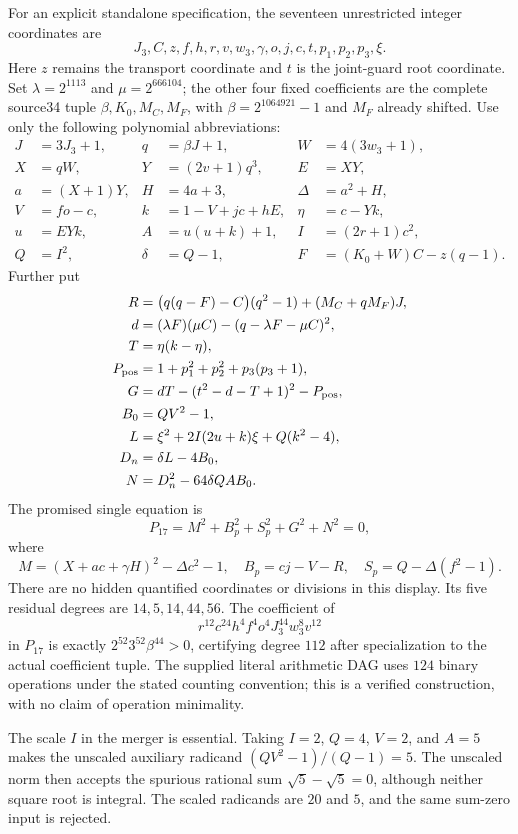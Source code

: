 \documentclass[11pt]{article}
\theoremstyle{remark}
\begin{document}
For an explicit standalone specification, the seventeen unrestricted
integer coordinates are
\[
 J_3,C,z,f,h,r,v,w_3,\gamma,o,j,c,t,p_1,p_2,p_3,\xi.
\]
Here $z$ remains the transport coordinate and $t$ is the joint-guard
root coordinate. Set $\lambda=2^{1113}$ and $\mu=2^{666104}$; the other
four fixed coefficients are the complete source34 tuple
$\beta,K_0,M_C,M_F$, with $\beta=2^{1064921}-1$ and $M_F$ already shifted.
Use only the following polynomial abbreviations:
\begin{align*}
 J&=3J_3+1,&q&=\beta J+1,&W&=4(3w_3+1),\\
 X&=qW,&Y&=(2v+1)q^3,&E&=XY,\\
 a&=(X+1)Y,&H&=4a+3,&\Delta&=a^2+H,\\
 V&=fo-c,&k&=1-V+jc+hE,&\eta&=c-Yk,\\
 u&=EYk,&A&=u(u+k)+1,&I&=(2r+1)c^2,\\
 Q&=I^2,&\delta&=Q-1,&F&=(K_0+W)C-z(q-1).
\end{align*}
Further put
\begin{align*}
 R&=\bigl(q(q-F)-C\bigr)(q^2-1)+(M_C+qM_F)J,\\
 d&=(\lambda F)(\mu C)-(q-\lambda F-\mu C)^2,\\
 T&=\eta(k-\eta),\\
 P_{\rm pos}&=1+p_1^2+p_2^2+p_3(p_3+1),\\
 G&=dT-(t^2-d-T+1)^2-P_{\rm pos},\\
 B_0&=QV^2-1,\\
 L&=\xi^2+2I(2u+k)\xi+Q(k^2-4),\\
 D_n&=\delta L-4B_0,\\
 N&=D_n^2-64\delta QAB_0.
\end{align*}
The promised single equation is
\begin{equation}\label{eq:full17}
 \boxed{P_{17}=M^2+B_p^2+S_p^2+G^2+N^2=0,}
\end{equation}
where
\[
 M=(X+ac+\gamma H)^2-\Delta c^2-1,\quad
 B_p=cj-V-R,\quad S_p=Q-\Delta(f^2-1).
\]
There are no hidden quantified coordinates or divisions in this display.
Its five residual degrees are $14,5,14,44,56$. The coefficient of
\[
 r^{12}c^{24}h^4f^4o^4J_3^{44}w_3^8v^{12}
\]
in $P_{17}$ is exactly $2^{52}3^{52}\beta^{44}>0$, certifying degree
$112$ after specialization to the actual coefficient tuple. The supplied
literal arithmetic DAG uses $124$ binary operations under the stated
counting convention; this is a verified construction, with no claim of
operation minimality.

The scale $I$ in the merger is essential. Taking $I=2$, $Q=4$, $V=2$,
and $A=5$ makes the unscaled auxiliary radicand
$(QV^2-1)/(Q-1)=5$. The unscaled norm then accepts the spurious rational
sum $\sqrt5-\sqrt5=0$, although neither square root is integral. The
scaled radicands are $20$ and $5$, and the same sum-zero input is rejected.
\end{document}
